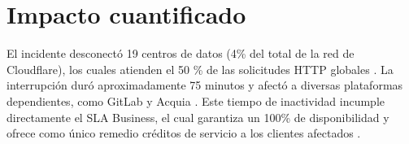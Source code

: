 \section{Impacto cuantificado}
El incidente desconectó 19 centros de datos (4\% del total de la red de Cloudflare), los cuales atienden el 50 \% de las solicitudes HTTP
globales \cite{cloudflare2022}. La interrupción duró aproximadamente 75 minutos y afectó a diversas plataformas dependientes, 
como GitLab \cite{gitlab2022incident} y Acquia \cite{acquia2022incident}. Este tiempo de inactividad incumple directamente el SLA Business, 
el cual garantiza un 100\% de disponibilidad y ofrece como único remedio créditos de servicio a los clientes afectados \cite{cloudflare2026sla}.
